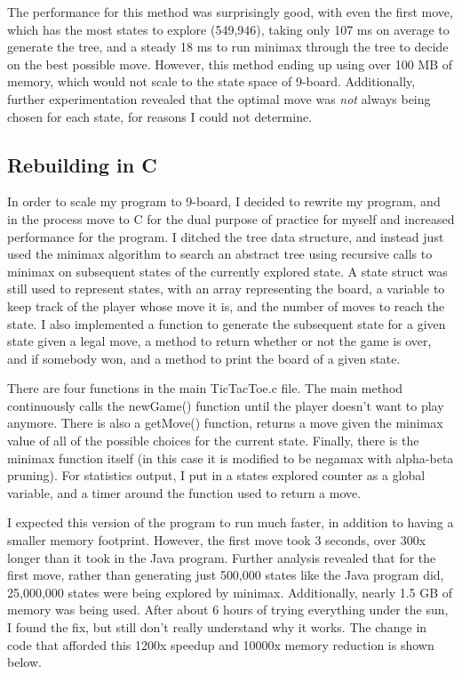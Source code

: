 \documentclass{article}
\begin{document}
The performance for this method was surprisingly good, with even the first move, which has the most states to explore (549,946), taking only 107 ms on average to generate the tree, and a steady 18 ms to run minimax through the tree to decide on the best possible move. However, this method ending up using over 100 MB of memory, which would not scale to the state space of 9-board. Additionally, further experimentation revealed that the optimal move was \textit{not} always being chosen for each state, for reasons I could not determine.
\subsection{Rebuilding in C}
In order to scale my program to 9-board, I decided to rewrite my program, and in the process move to C for the dual purpose of practice for myself and increased performance for the program. I ditched the tree data structure, and instead just used the minimax algorithm to search an abstract tree using recursive calls to minimax on subsequent states of the currently explored state. A state struct was still used to represent states, with an array representing the board, a variable to keep track of the player whose move it is, and the number of moves to reach the state. I also implemented a function to generate the subsequent state for a given state given a legal move, a method to return whether or not the game is over, and if somebody won, and a method to print the board of a given state.

There are four functions in the main TicTacToe.c file. The main method continuously calls the newGame() function until the player doesn't want to play anymore. There is also a getMove() function, returns a move given the minimax value of all of the possible choices for the current state. Finally, there is the minimax function itself (in this case it is modified to be negamax with alpha-beta pruning). For statistics output, I put in a states explored counter as a global variable, and a timer around the function used to return a move.

I expected this version of the program to run much faster, in addition to having a smaller memory footprint. However, the first move took 3 seconds, over 300x longer than it took in the Java program. Further analysis revealed that for the first move, rather than generating just 500,000 states like the Java program did, 25,000,000 states were being explored by minimax. Additionally, nearly 1.5 GB of memory was being used. After about 6 hours of trying everything under the sun, I found the fix, but still don't really understand why it works. The change in code that afforded this 1200x speedup and 10000x memory reduction is shown below.
\end{document}
